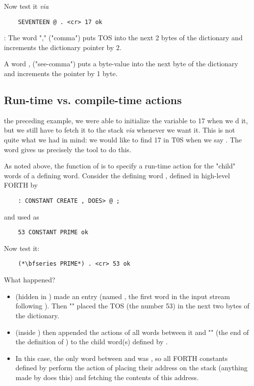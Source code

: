 Now test it \textit{via}

\begin{lstlisting}
    SEVENTEEN @ . <cr> 17 ok
\end{lstlisting}

\leftbar[1\linewidth]
\Note: The word "," ("comma") puts TOS into the next 2 bytes of the dictionary and increments the dictionary pointer by 2.

A word , ("see-comma") puts a byte-value into the next byte of the dictionary and increments the pointer by 1 byte.
\endleftbar

\subsection{Run-time vs. compile-time actions}

 the preceding example, we were able to initialize the variable  to 17 when we d it, but we still have to fetch it to the stack \textit{via}  whenever we want it. This is not quite what we had in mind: we would like to find 17 in T0S when we say . The word  gives us precisely the tool to do this.

As noted above, the function of  is to specify a run-time action for the "child" words of a defining word. Consider the defining word , defined in high-level FORTH by

\begin{lstlisting}
    : CONSTANT CREATE , DOES> @ ;
\end{lstlisting}
and used as
\begin{lstlisting}
    53 CONSTANT PRIME ok
\end{lstlisting}

Now test it:
\begin{lstlisting}
    (*\bfseries PRIME*) . <cr> 53 ok
\end{lstlisting}

What happened?
\begin{itemize}
    \item {} (hidden in ) made an entry (named  , the first word in the input stream following ). Then "\bc{,}" placed the TOS (the number 53) in the next two bytes of the dictionary.
    \item {} (inside ) then appended the actions of all words between it and "\bc{;}" (the end of the definition of ) to the child word(s) defined by .
    \item In this case, the only word between  and \bc{;} was  , so all FORTH constants defined by  perform the action of placing their address on the stack (anything made by  does this) and fetching the contents of this address.
\end{itemize}


